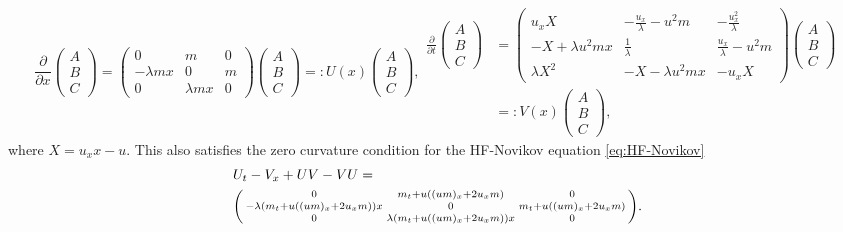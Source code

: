 \documentclass[english,master]{liumaiex}
\theoremstyle{thesisplain}
\theoremstyle{thesisdefinition}
\numberwithin{equation}{section}
\begin{document}
\begin{subequations}
  \begin{equation}
    \frac{\partial}{\partial x}
    \begin{pmatrix} A \\ B \\ C \end{pmatrix} =
    \begin{pmatrix}
      0 & m & 0 \\
      -\lambda m x & 0 & m \\
      0 & \lambda m x & 0
    \end{pmatrix}
    \begin{pmatrix} A \\ B \\ C \end{pmatrix}
	=: U(x) \begin{pmatrix} A \\ B \\ C \end{pmatrix}
    ,
  \end{equation}
  \begin{align}
    \frac{\partial}{\partial t}
    \begin{pmatrix} A \\ B \\ C \end{pmatrix} &=
    \begin{pmatrix}
      u_x X & -\frac{u_x}{\lambda} -u^2 m & -\frac{u_x^2}{\lambda} \\
      -X + \lambda u^2 m x & \frac{1}{\lambda} & \frac{u_x}{\lambda} - u^2 m \\
      \lambda X^2 & -X - \lambda u^2 m x & -u_x X
    \end{pmatrix}
    \begin{pmatrix} A \\ B \\ C \end{pmatrix} \\
	&=: V(x) \begin{pmatrix} A \\ B \\ C \end{pmatrix}
    ,
  \end{align}
\end{subequations}
where $X = u_x x - u$. This also satisfies the zero curvature condition for the HF-Novikov equation \eqref{eq:HF-Novikov}
\begin{equation}
\begin{aligned}
	&U_t - V_x + UV - VU = \\
    &\begin{psmallmatrix}
      0 & m_t + u((um)_x + 2u_x m) & 0 \\
      -\lambda(m_t + u((um)_x + 2u_x m))x & 0 & m_t + u((um)_x + 2u_x m) \\
      0 & \lambda(m_t + u((um)_x + 2u_x m))x & 0
    \end{psmallmatrix}.
\end{aligned}
\end{equation}
\end{document}
